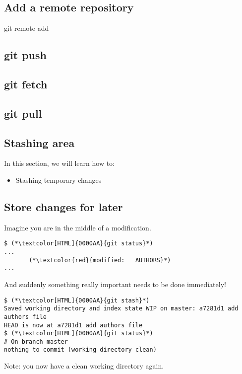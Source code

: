 \subsection{Add a remote repository}
\begin{frame}[fragile]
  \subslidetitle
  git remote add
\end{frame}

\subsection{git push}
\begin{frame}[fragile]
  \subslidetitle
\end{frame}

\subsection{git fetch}
\begin{frame}[fragile]
  \subslidetitle
\end{frame}

\subsection{git pull}
\begin{frame}[fragile]
  \subslidetitle
\end{frame}

\subsection{Stashing area}
\begin{frame}[fragile]
  \slidetitle

  In this section, we will learn how to:
  \begin{itemize}
    \item Stashing temporary changes
  \end{itemize}
\end{frame}


\subsection{Store changes for later}
\begin{frame}[fragile]
\subslidetitle

Imagine you are in the middle of a modification.

\begin{lstlisting}
$ (*\textcolor[HTML]{0000AA}{git status}*)
...
       (*\textcolor{red}{modified:   AUTHORS}*)
...
\end{lstlisting}

And suddenly something really important needs to be done immediately!

\begin{lstlisting}
$ (*\textcolor[HTML]{0000AA}{git stash}*)
Saved working directory and index state WIP on master: a7281d1 add authors file
HEAD is now at a7281d1 add authors file
$ (*\textcolor[HTML]{0000AA}{git status}*)
# On branch master
nothing to commit (working directory clean)
\end{lstlisting}
Note: you now have a clean working directory again.
\end{frame}


